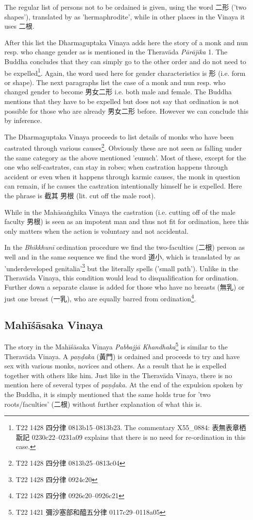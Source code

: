 The regular list of persons not to be ordained is given, using the word 二形 ('two shapes'), translated by \cite{bodhi} as 'hermaphrodite', while in other places in the Vinaya it uses 二根. 

After this list the Dharmaguptaka Vinaya adds here the story of a monk and nun resp. who change gender as is mentioned in the Theravāda {\em Pārājika} 1. The Buddha concludes that they can simply go to the other order and do not need to be expelled\footnote{T22 1428 四分律 0813b15–0813b23. The commentary X55_0884: 表無表章栖翫記 0230c22–0231a09 explains that there is no need for re-ordination in this case.}. Again, the word used here for gender characteristics is 形 (i.e. form or shape). The next paragraphs list the case of a monk and nun resp. who changed gender to become 男女二形 i.e. both male and female. The Buddha mentions that they have to be expelled but does not say that ordination is not possible for those who are already 男女二形 before. However we can conclude this by inference.

The Dharmaguptaka Vinaya proceeds to list details of monks who have been castrated through various causes\footnote{T22 1428 四分律 0813b25–0813c04}. Obviously these are not seen as falling under the same category as the above mentioned 'eunuch'. Most of these, except for the one who self-castrates, can stay in robes; when castration happens through accident or even when it happens through karmic causes, the monk in question can remain, if he causes the castration intentionally himself he is expelled. Here the phrase is 截其 男根 (lit. cut off the male root).

While in the Mahāsaṅghika Vinaya the castration (i.e. cutting off of the male faculty 男根) is seen as an impotent man and thus not fit for ordination, here this only matters when the action is voluntary and not accidental.

In the {\em Bhikkhunī} ordination procedure we find the two-faculties (二根) person as well and in the same sequence we find the word 道小, which is translated by \cite{bodhi} as 'underdeveloped genitalia'\footnote{T22 1428 四分律 0924c20} but the literally spells ('small path'). Unlike in the Theravāda Vinaya, this condition would lead to disqualification for ordination. Further down a separate clause is added for those who have no breasts (無乳) or just one breast (一乳), who are equally barred from ordination\footnote{T22 1428 四分律 0926c20–0926c21}.


\subsection{Mahīśāsaka Vinaya}
The story in the Mahīśāsaka Vinaya {\em Pabbajjā Khandhaka}\footnote{T22 1421 彌沙塞部和醯五分律 0117c29–0118a05} is similar to the Theravāda Vinaya. A {\em paṇḍaka} (黃門) is ordained and proceeds to try and have sex with various monks, novices and others. As a result that he is expelled together with others like him. Just like in the Theravāda Vinaya, there is no mention here of several types of {\em paṇḍaka}. At the end of the expulsion spoken by the Buddha, it is simply mentioned that the same holds true for 'two roots/faculties' (二根) without further explanation of what this is.

